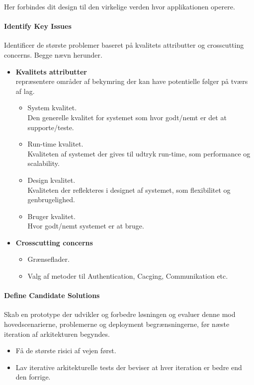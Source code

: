 Her forbindes dit design til den virkelige verden hvor applikationen operere. 

\paragraph{Identify Key Issues}
Identificer de største problemer baseret på kvalitets attributter og crosscutting concerns. Begge nævn herunder.

\begin{itemize}
	\item \textbf{Kvalitets attributter}\\
	repræsentere områder af bekymring der kan have potentielle følger på tværs af lag.
	\begin{itemize}
		\item System kvalitet.\\
		Den generelle kvalitet for systemet som hvor godt/nemt er det at supporte/teste.
		\item Run-time kvalitet.\\
		Kvaliteten af systemet der gives til udtryk run-time, som performance og scalability.
		\item Design kvalitet.\\
		Kvaliteten der reflekteres i designet af systemet, som flexibilitet og genbrugelighed.
		\item Bruger kvalitet.\\
		Hvor godt/nemt systemet er at bruge.
	\end{itemize}
	\item \textbf{Crosscutting concerns}
	\begin{itemize}
		\item Grænseflader.
		\item Valg af metoder til Authentication, Cacging, Communikation etc.
	\end{itemize}
\end{itemize}

\paragraph{Define Candidate Solutions}
Skab en prototype der udvikler og forbedre løsningen og evaluer denne mod hovedscenarierne, problemerne og deployment begrænsningerne, før næste iteration af arkitekturen begyndes.

\begin{itemize}
	\item Få de største risici af vejen først.
	\item Lav iterative arkitekturelle tests der beviser at hver iteration er bedre end den forrige.
\end{itemize}

